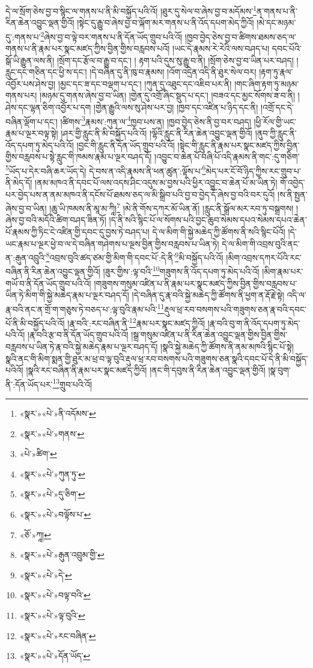 དེ་ལ་སྲོག་ཅེས་བྱ་བ་སྙིང་ལ་གནས་པ་ནི་མི་བསྐྱོད་པའི་འོ། །ཐུར་དུ་སེལ་བ་ཞེས་བྱ་བ་མདོམས་\footnote{«སྣར་»«པེ་»ནི་འདོམས་}ན་གནས་པ་ནི་རིན་ཆེན་འབྱུང་ལྡན་གྱིའོ། །སྟེང་དུ་རྒྱུ་བ་ཞེས་བྱ་བ་ལྐོག་མར་གནས་པ་ནི་འོད་དཔག་མེད་ཀྱིའོ། །མེ་དང་མཉམ་དུ་:གནས་པ་\footnote{«སྣར་»«པེ་»གནས་}ཞེས་བྱ་བ་ལྟེ་བར་གནས་པ་ནི་དོན་ཡོད་གྲུབ་པའི་འོ། །ཁྱབ་བྱེད་ཅེས་བྱ་བ་ཚིགས་ཐམས་ཅད་ལ་གནས་པ་ནི་རྣམ་པར་སྣང་མཛད་ཀྱིས་བྱིན་གྱིས་བརླབས་པའོ། །ཡང་དེ་རྣམས་རེ་རེའི་ལས་བཤད་པ། དབང་པོའི་སྒོ་ཡི་རྒྱུན་ལས་ནི། །སྲོག་དང་རྩོལ་བ་རྒྱུ་བ་དང་། །
རྟག་པའི་དུས་སུ་རྒྱུ་བ་ནི། །སྲོག་ཅེས་བྱ་བ་ཡིན་པར་བཤད། །རླུང་དང་གཅིན་དང་ཕྱི་ས་དང་། །དེ་བཞིན་དུ་ནི་ཁུ་བ་རྣམས། །འོག་འདྲེན་འདི་ནི་ཐུར་སེལ་བར། །རྟག་ཏུ་རྣལ་འབྱོར་པས་ཤེས་བྱ། །མྱང་དང་ཟ་དང་བལྡག་པ་དང་། །ཀུན་དུ་འཐུང་དང་འཇིབ་པར་ནི། །གང་ཞིག་རྟག་ཏུ་མཉམ་གནས་པར། །མཉམ་དུ་གནས་ཞེས་བྱ་བ་ཡིན། །གྱེན་དུ་འགྲོ་ཞིང་སྡུད་པ་དང་། །བཟའ་དང་མྱང་སོགས་ཟ་བ་ནི། །ཤེས་དང་ལྷན་ཅིག་འབྱོར་པ་དག །གྱེན་རྒྱུའི་ལས་སུ་ཤེས་པར་བྱ། །ཁྱབ་དང་འཛིན་པ་ཉིད་དང་ནི། །འགྲོ་དང་དེ་བཞིན་ལྡོག་པ་དང་། །ཚིགས་\footnote{«པེ་»ཚིག་}རྣམས་:ཀུན་ལ་\footnote{«སྣར་»«པེ་»ཀུན་ཏུ་}ཁྱབ་པས་ན། །ཁྱབ་བྱེད་ཅེས་ནི་བྱ་བར་བཤད། །ཕྱི་རོལ་གྱི་ཡང་རྣམ་པ་ལྔར་བལྟ་སྟེ། །ཤར་གྱི་རླུང་ནི་མི་བསྐྱོད་པའི་འོ། །ལྷོའི་རླུང་ནི་རིན་ཆེན་འབྱུང་ལྡན་གྱིའོ། །ནུབ་ཀྱི་རླུང་ནི་འོད་དཔག་ཏུ་མེད་པའི་འོ། །བྱང་གི་རླུང་ནི་དོན་ཡོད་གྲུབ་པའི་འོ། །སྟེང་གི་རླུང་ནི་རྣམ་པར་སྣང་མཛད་ཀྱིས་བྱིན་གྱིས་བརླབས་པ་སྟེ་རླུང་གི་ཁམས་རྣམ་པ་ལྔར་བཤད་དོ། །འབྱུང་བ་ཆེན་པོ་བཞི་པོ་འདི་རྣམས་ནི་གང་:དུ་གཅིག་\footnote{«སྣར་»«པེ་»དུ་ཅིག་}ཡོད་པ་དེར་བཞི་ཆར་ཡོད་དེ། དེ་བས་ན་འདི་རྣམས་ནི་ཕན་ཚུན་:ལྟོས་པ་\footnote{«སྣར་»«པེ་»བལྟོས་པ་}མེད་པར་ངོ་བོ་ཉིད་ཀྱིས་རང་གྲུབ་པ་ནི་མེད་དོ། །ནམ་མཁའ་ནི་དབང་པོ་ལས་འདས་ཤིང་འདུས་མ་བྱས་པའི་ཕྱིར་འབྱུང་བ་ཆེན་པོ་མ་ཡིན་ཏེ། གོ་འབྱེད་པར་བྱེད་པས་ན་ནམ་མཁའ་ནི་དངོས་པོ་ཐམས་ཅད་ལ་མི་སྒྲིབ་པའི་བྱ་བ་བྱེད་དོ་ཞེས་བྱ་བའི་བར་དུའོ། །ས་ནི་སྤྱན་ཞེས་བྱ་བ་ཡིན། །ཆུ་ཡི་ཁམས་ནི་མཱ་མ་ཀཱི།\footnote{«ཅོ་»ཀཱ།} །མེ་ནི་གོས་དཀར་མོ་ཡིན་ནོ། །རླུང་ནི་སྒྲོལ་མར་རབ་ཏུ་བསྒྲགས། །ཞེས་བྱ་བའི་མདོའི་ཚིག་བཤད་ཟིན་ཏོ། །ད་ནི་སའི་སྙིང་པོ་ལ་སོགས་པའི་བྱང་ཆུབ་སེམས་དཔའ་སེམས་དཔའ་ཆེན་པོ་རྣམས་ཀྱི་ཏིང་ངེ་འཛིན་གྱི་དབང་དུ་བྱས་ཏེ་བཤད་པ། དེ་ལ་མིག་གི་སྐྱེ་མཆེད་ཀྱི་ཚོགས་ནི་སའི་སྙིང་པོའོ། །དེ་ཡང་རྣམ་པ་ལྔར་ཕྱེ་བ་ལ་དེ་བཞིན་གཤེགས་པ་ལྔས་བྱིན་གྱིས་བརླབས་པ་ཡིན་ཏེ། དེ་ལ་མིག་གི་འབྲས་བུའི་ནང་ན་:རྒུན་འབྲུའི་\footnote{«སྣར་»«པེ་»རྒུན་འབྲུམ་གྱི་}འབྲས་བུའི་ཚད་ཙམ་གྱི་མིག་གི་དབང་པོ་:དེ་ནི་\footnote{«སྣར་»«པེ་»དེ་}མི་བསྐྱོད་པའི་འོ། །མིག་འབྲས་དཀར་པོའི་རང་བཞིན་ནི་རིན་ཆེན་འབྱུང་ལྡན་གྱིའོ། །ཟུར་གྱིས་:ལྟ་བའི་\footnote{«སྣར་»«པེ་»བལྟ་བའི་}གཟུགས་ནི་འོད་དཔག་ཏུ་མེད་པའི་འོ། །མིག་རྣམ་པར་གཡོ་བ་ནི་དོན་ཡོད་གྲུབ་པའི་འོ། །གཟུགས་གསུམ་འཛིན་པ་ནི་རྣམ་པར་སྣང་མཛད་ཀྱིས་བྱིན་གྱིས་བརླབས་པ་ཡིན་ཏེ་མིག་གི་སྐྱེ་མཆེད་རྣམ་པ་ལྔར་བཤད་དོ། །དེ་བཞིན་དུ་རྣ་བའི་སྐྱེ་མཆེད་ཀྱི་ཚོགས་ནི་ཕྱག་ན་རྡོ་རྗེ་སྟེ། འདི་ལ་རྣ་བའི་ནང་ན་གྲོ་ག་གཅུས་ཏེ་བཅད་པ་:ལྟ་བུའི་རྣམ་པའི་\footnote{«སྣར་»«པེ་»ལྟ་བུའི་}རྡུལ་ཕྲ་རབ་བསགས་པའི་གཟུགས་ཅན་རྣ་བའི་དབང་པོ་ནི་མི་བསྐྱོད་པའི་འོ། །རྣ་བའི་:རང་བཞིན་ནི་\footnote{«སྣར་»«པེ་»རང་བཞིན་}རྣམ་པར་སྣང་མཛད་ཀྱིའོ། །རྣ་བའི་བུ་ག་ནི་འོད་དཔག་ཏུ་མེད་པའི་འོ། །རྣ་བའི་རྩ་བ་ནི་དོན་ཡོད་གྲུབ་པའི་འོ། །སྒྲ་གསུམ་འཛིན་པ་ནི་རིན་ཆེན་འབྱུང་ལྡན་གྱིས་བྱིན་གྱིས་བརླབས་པ་ཡིན་ཏེ་རྣ་བའི་སྐྱེ་མཆེད་རྣམ་པ་ལྔར་བཤད་དོ། །སྣའི་སྐྱེ་མཆེད་ཀྱི་ཚོགས་ནི་ནམ་མཁའི་སྙིང་པོ་སྟེ། སྣའི་ནང་གི་མིག་སྨན་གྱི་ཐུར་མ་ཕྲ་བ་ལྟ་བུའི་རྡུལ་ཕྲ་རབ་བསགས་པའི་གཟུགས་ཅན་སྣའི་དབང་པོ་དེ་ནི་མི་བསྐྱོད་པའིའོ། །སྣའི་རང་བཞིན་ནི་རྣམ་པར་སྣང་མཛད་ཀྱིའོ། །ནང་གི་དབུས་ནི་རིན་ཆེན་འབྱུང་ལྡན་གྱིའོ། །སྣ་བུག་ནི་:དོན་ཡོད་པར་\footnote{«སྣར་»«པེ་»དོན་ཡོད་}གྲུབ་པའི་འོ། 